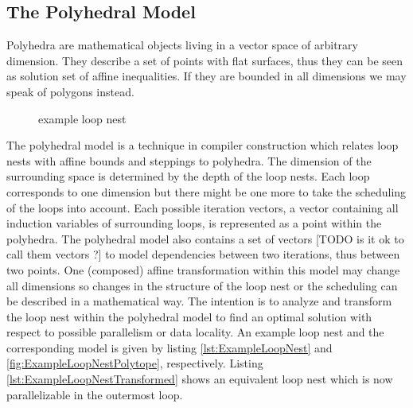 \orange
\begin{shaded}
\section{The Polyhedral Model}
Polyhedra are mathematical objects living in a vector space of arbitrary 
dimension. They describe a set of points with flat surfaces, thus they can be
seen as solution set of affine inequalities. If they are bounded in all 
dimensions we may speak of polygons instead. 
\lstset{frame=none}
\begin{figure}
  \centering
  \subfloat[source]{%
    
    \label{lst:ExampleLoopNest}
  } 

  \caption{example loop nest}
  \label{fig:ExampleLoopNest}
\end{figure}
\resetlst
The polyhedral model is a technique
in compiler construction which relates loop nests with affine bounds and steppings
to polyhedra. The dimension of the surrounding space is determined
by the depth of the loop nests. Each loop corresponds to one dimension but there
might be one more to take the scheduling of the loops into account. Each possible
iteration vectors, a vector containing all induction variables of surrounding 
loops, is represented as a point within the polyhedra. The polyhedral model also contains 
a set of vectors [TODO is it ok to call them vectors ?] to model dependencies
between two iterations, thus between two points. One (composed)
affine transformation within this model may change all dimensions so changes in 
the structure of the loop nest or the scheduling can be described in a
mathematical way. The intention is to analyze and transform the loop nest within
the polyhedral model to find an optimal solution with respect to possible parallelism
or data locality. An example loop nest and the corresponding model
is given by listing \ref{lst:ExampleLoopNest} and 
\ref{fig:ExampleLoopNestPolytope}, respectively. 
Listing \ref{lst:ExampleLoopNestTransformed} shows an equivalent loop nest 
which is now parallelizable in the outermost loop.

\end{shaded}



